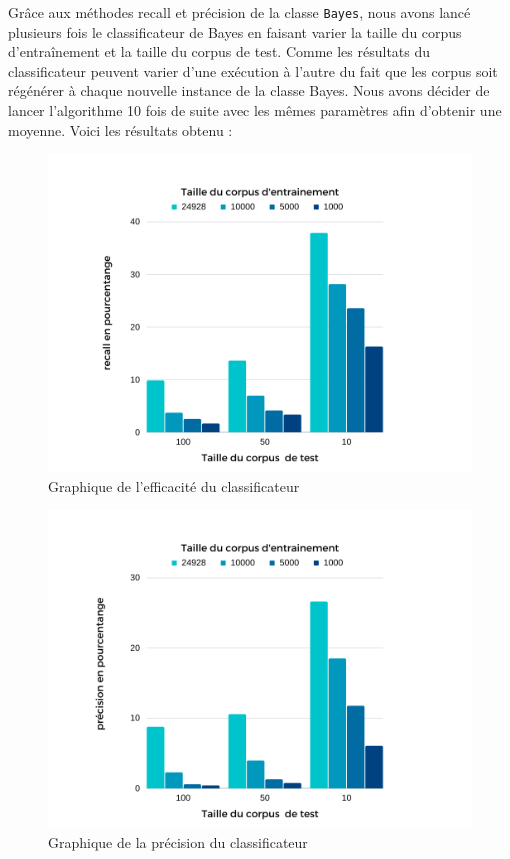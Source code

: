 \documentclass[french,12pt]{article}
\begin{document}
Grâce aux méthodes recall et précision de la classe \texttt{Bayes}, nous avons lancé plusieurs fois le classificateur de Bayes en faisant varier la taille du corpus d'entraînement et la taille du corpus de test. Comme les résultats du classificateur peuvent varier d'une exécution à l'autre du fait que les corpus soit régénérer à chaque nouvelle instance de la classe Bayes. Nous avons décider de lancer l'algorithme 10 fois de suite avec les mêmes paramètres afin d'obtenir une moyenne.
Voici les résultats obtenu :
\begin{center}
\begin{figure}
\includegraphics[scale=0.4]{img/TableauRecall.png}
\caption{Graphique de l'efficacité du classificateur}
\end{figure}


\end{center}
\begin{center}
\begin{figure}
\includegraphics[scale=0.4]{img/TableauPrecision.png}
\caption{Graphique de la précision du classificateur}
\end{figure}


\end{center}
\newpage
\end{document}
